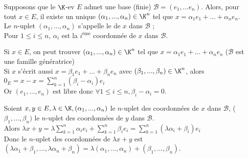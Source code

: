 \documentclass[12pt, a4paper]{report}
\begin{document}
\begin{proposition}{}{}
Supposons que le $\K$-ev $E$ admet une base (finie) $\mathcal{B} = (e_1,...e_n)$. Alors, pour tout $x \in E$, il existe un unique $(\alpha_1,...,\alpha_n) \in \K^n$ tel que $x = \alpha_1e_1+...+\alpha_ne_n$. \\
Le $n$-uplet $(\alpha_1,...,\alpha_n)$ s'appelle le  de $x$ dans $\mathcal{B}$ ; \\
Pour $1 \le i \le n$, $\alpha_i$ est la $i^\text{ème}$ coordonnée de $x$ dans $\mathcal{B}$.
\end{proposition}

\begin{demo}{}
Si $x \in E$, on peut trouver $(\alpha_1,...,\alpha_n) \in \K^n$ tel que $x = \alpha_1e_1+...+\alpha_ne_n$ ($\mathcal{B}$ est une famille génératrice) \\
Si $x$ s'écrit aussi $x = \beta_1e_1+...+\beta_ne_n$ avec $(\beta_1,...,\beta_n) \in \K^n$, alors \\
$0_E = x-x = \displaystyle{\sum_{k=1}^{n} (\beta_i-\alpha_i)e_i}$ \\
Or $(e_1,...,e_n)$ est libre donc $\forall 1 \le i \le n, \beta_i - \alpha_i = 0$.
\end{demo}

\begin{remarque}{}
Soient $x,y \in E, \lambda \in \K, (\alpha_1,...,\alpha_n)$ le $n$-uplet des coordonnées de $x$ dans $\mathcal{B}$, ($\beta_1,...,\beta_n)$ le $n$-uplet des coordonnées de $y$ dans $\mathcal{B}$. \\
Alors $\lambda x + y = \lambda \displaystyle{\sum_{k=1}^{n} \alpha_i e_i + \sum_{k=1}^{n} \beta_i e_i = \sum_{k=1}^{n}(\lambda \alpha_i + \beta_i)e_i}$ \\
Donc le $n$-uplet des coordonnées de $\lambda x + y$ est $(\lambda \alpha_1 + \beta_1,...,\lambda \alpha_n + \beta_n) = \lambda (\alpha_1,...,\alpha_n) + (\beta_1,...,\beta_n)$.
\end{remarque}
\end{document}
